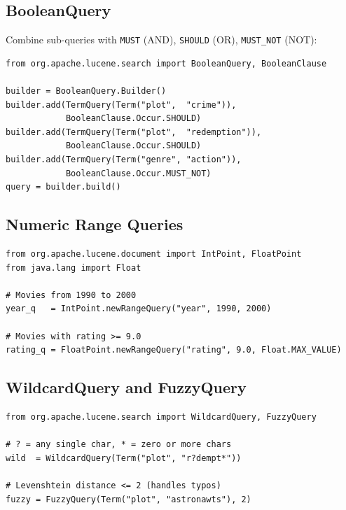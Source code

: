 \documentclass[11pt,a4paper]{article}
\begin{document}
\subsection{BooleanQuery}

Combine sub-queries with \texttt{MUST} (AND), \texttt{SHOULD} (OR),
\texttt{MUST\_NOT} (NOT):

\begin{lstlisting}[caption={BooleanQuery -- combining clauses (MUST/SHOULD/MUST NOT)}]
from org.apache.lucene.search import BooleanQuery, BooleanClause

builder = BooleanQuery.Builder()
builder.add(TermQuery(Term("plot",  "crime")),
            BooleanClause.Occur.SHOULD)
builder.add(TermQuery(Term("plot",  "redemption")),
            BooleanClause.Occur.SHOULD)
builder.add(TermQuery(Term("genre", "action")),
            BooleanClause.Occur.MUST_NOT)
query = builder.build()
\end{lstlisting}

\subsection{Numeric Range Queries}

\begin{lstlisting}[caption={IntPoint and FloatPoint -- numeric range queries}]
from org.apache.lucene.document import IntPoint, FloatPoint
from java.lang import Float

# Movies from 1990 to 2000
year_q   = IntPoint.newRangeQuery("year", 1990, 2000)

# Movies with rating >= 9.0
rating_q = FloatPoint.newRangeQuery("rating", 9.0, Float.MAX_VALUE)
\end{lstlisting}

\subsection{WildcardQuery and FuzzyQuery}

\begin{lstlisting}[caption={WildcardQuery and FuzzyQuery -- approximate matching}]
from org.apache.lucene.search import WildcardQuery, FuzzyQuery

# ? = any single char, * = zero or more chars
wild  = WildcardQuery(Term("plot", "r?dempt*"))

# Levenshtein distance <= 2 (handles typos)
fuzzy = FuzzyQuery(Term("plot", "astronawts"), 2)
\end{lstlisting}
\end{document}
